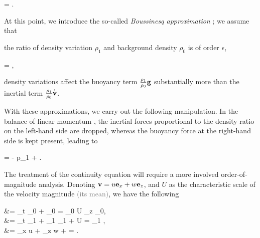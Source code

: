 \documentclass[../main.tex]{subfiles}
\begin{document}
\begin{equations}[single,*]
 = \epsilon {}.
\end{equations}

At this point, we introduce the so-called \emph{Boussinesq approximation} \autocite[p.~4]{spiegelBoussinesqApproximationCompressible1960} \autocite[p.~26]{nappoIntroductionAtmosphericGravity2013}; we assume that

\begin{compactenum}
\item the ratio of density variation $\rho_1$ and background density $\rho_0$ is of order $\epsilon$, \begin{equations}[single,*]
		 = \bigO{\epsilon},
	\end{equations}
\item density variations affect the buoyancy term $\frac{\rho_1}{\rho_0} \mathbf{g}$ substantially more than the inertial term $\frac{\rho_1}{\rho_{0}}\tdot{\vb{v}}$.\sidenotemark
\end{compactenum}

With these approximations, we carry out the following manipulation. In the balance of linear momentum , the inertial forces proportional to the density ratio on the left-hand side are dropped, whereas the buoyancy force at the right-hand side is kept present, leading to

\begin{equations}[single,*]
	 = -  \grad p_1 +  .
\end{equations}

The treatment of the continuity equation will require a more involved order-of-magnitude analysis. Denoting $\mathbf{v} = u \mathbf{e}_x + w \mathbf{e}_z$, and $U$ as the characteristic scale of the velocity magnitude \textcolor{gray}{(\eg its mean)}, we have the following

\begin{equations}[columns,*]
	 &= \partial_t \rho_0 +  \cdot \grad \rho_0 =  \cdot \grad \rho_0 \propto U \partial_{z} \rho_0, \\ 
	 &= \partial_t \rho_1 +  \cdot \grad \rho_1 \propto {}\rho_1 + U  = \rho_1 ,\\
	\div {} &= \partial_{x} u + \partial_{z} w \propto {} +  = .
\end{equations}
\end{document}
